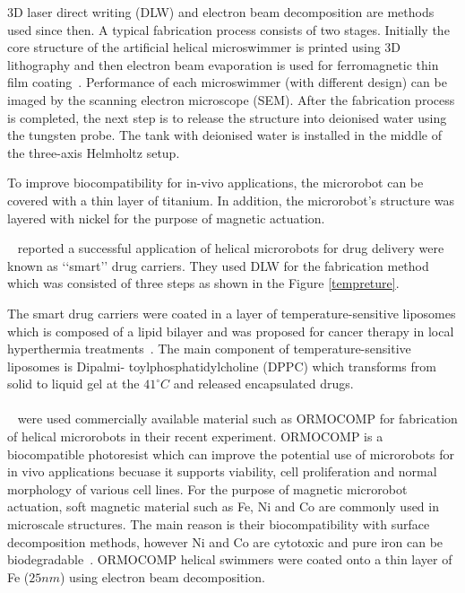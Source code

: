 \documentclass[12pt,a4paper,titlepage]{report}
\begin{document}
3D laser direct writing (DLW) and electron beam decomposition are methods used since then. A typical 
fabrication process consists of two stages. Initially the core structure of the artificial helical 
microswimmer is printed using 3D lithography and then electron beam evaporation is used for 
ferromagnetic thin film coating~\citep{tottori2013artificial}.  
Performance of each microswimmer (with different design) can be imaged by the scanning electron
 microscope (SEM). After the fabrication process is completed, the next step is to release the structure into 
deionised water using the tungsten probe. The tank with deionised water is installed in the middle of the 
three-axis Helmholtz setup. 



To improve biocompatibility for in-vivo applications, the 
microrobot can be covered with a thin layer of titanium. In addition, the microrobot\rq{}s structure was layered with 
nickel for the purpose of magnetic actuation.

\citeauthor{qiu2014artificial}~\citep{qiu2014artificial} reported a successful application of helical microrobots
for drug delivery were known as \lq\lq{}smart\rq\rq{} drug carriers. They used DLW for the fabrication method which 
was consisted of three steps as shown in the Figure \ref{tempreture}. 



The smart drug carriers were coated in a layer of temperature-sensitive liposomes which is composed 
of a lipid bilayer and was proposed for cancer therapy in local hyperthermia treatments~\citep{qiu2014artificial}.
The main component of temperature-sensitive liposomes is Dipalmi- toylphosphatidylcholine (DPPC) which
transforms from solid to liquid gel at the $41^{\circ} C$ and released encapsulated drugs.

\paragraph{}
 \citeauthor{qiu2014noncytotoxic}~\citep{qiu2014noncytotoxic} were used commercially available material such as ORMOCOMP
 for fabrication of helical microrobots in their recent experiment. ORMOCOMP is a biocompatible photoresist which
can improve the potential use of microrobots for in vivo applications becuase it supports viability, cell proliferation
 and normal morphology of various cell lines. For the purpose of magnetic microrobot actuation, soft magnetic material
such as Fe, Ni and Co are commonly used in microscale structures. The main reason is their biocompatibility
with surface decomposition methods, however Ni and Co are cytotoxic and pure iron can be biodegradable~\citep{qiu2014noncytotoxic}.
ORMOCOMP helical swimmers were coated onto a thin layer of Fe ($25 nm$) using electron beam decomposition.
  
\end{document}

